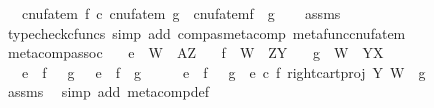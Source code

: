 \begin{isabellebody}
\ \ \ {\isachardoublequoteopen}cnufatem\ f\ {\isasymcirc}\isactrlsub c\ cnufatem\ g\ {\isacharequal}{\kern0pt}\ cnufatem{\isacharparenleft}{\kern0pt}f\ {\isasymbox}\ g{\isacharparenright}{\kern0pt}{\isachardoublequoteclose}\isanewline
%
\isadelimproof
\ \ %
\endisadelimproof
%
\isatagproof
{}\isamarkupfalse%
\ assms\ \isamarkupfalse%
\ {\isacharparenleft}{\kern0pt}typecheck{\isacharunderscore}{\kern0pt}cfuncs{\isacharcomma}{\kern0pt}\ simp\ add{\isacharcolon}{\kern0pt}\ comp{\isacharunderscore}{\kern0pt}as{\isacharunderscore}{\kern0pt}metacomp\ metafunc{\isacharunderscore}{\kern0pt}cnufatem{\isacharparenright}{\kern0pt}%
\endisatagproof
{\isafoldproof}%
%
\isadelimproof
\isanewline
%
\endisadelimproof
\isanewline
{}\isamarkupfalse%
\ meta{\isacharunderscore}{\kern0pt}comp{\isacharunderscore}{\kern0pt}assoc{\isacharcolon}{\kern0pt}\isanewline
\ \ \ {\isachardoublequoteopen}e\ {\isacharcolon}{\kern0pt}\ W\ {\isasymrightarrow}\ A\isactrlbsup Z\isactrlesup {\isachardoublequoteclose}\isanewline
\ \ \ {\isachardoublequoteopen}f\ {\isacharcolon}{\kern0pt}\ W\ {\isasymrightarrow}\ Z\isactrlbsup Y\isactrlesup {\isachardoublequoteclose}\isanewline
\ \ \ {\isachardoublequoteopen}g\ {\isacharcolon}{\kern0pt}\ W\ {\isasymrightarrow}\ Y\isactrlbsup X\isactrlesup {\isachardoublequoteclose}\isanewline
\ \ \ {\isachardoublequoteopen}{\isacharparenleft}{\kern0pt}e\ {\isasymbox}\ f{\isacharparenright}{\kern0pt}\ {\isasymbox}\ \ g\ \ {\isacharequal}{\kern0pt}\ e\ {\isasymbox}\ {\isacharparenleft}{\kern0pt}f\ {\isasymbox}\ g{\isacharparenright}{\kern0pt}{\isachardoublequoteclose}\isanewline
%
\isadelimproof
%
\endisadelimproof
%
\isatagproof
{}\isamarkupfalse%
\ {\isacharminus}{\kern0pt}\isanewline
\ \ \isamarkupfalse%
\ {\isachardoublequoteopen}{\isacharparenleft}{\kern0pt}e\ {\isasymbox}\ f{\isacharparenright}{\kern0pt}\ {\isasymbox}\ \ g\ {\isacharequal}{\kern0pt}\ {\isacharparenleft}{\kern0pt}e\isactrlsup {\isasymflat}\ {\isasymcirc}\isactrlsub c\ {\isasymlangle}f\isactrlsup {\isasymflat}{\isacharcomma}{\kern0pt}\ right{\isacharunderscore}{\kern0pt}cart{\isacharunderscore}{\kern0pt}proj\ Y\ W{\isasymrangle}{\isacharparenright}{\kern0pt}\isactrlsup {\isasymsharp}\ {\isasymbox}\ g{\isachardoublequoteclose}\isanewline
\ \ \ \ \isamarkupfalse%
\ assms\ \isamarkupfalse%
\ {\isacharparenleft}{\kern0pt}simp\ add{\isacharcolon}{\kern0pt}\ meta{\isacharunderscore}{\kern0pt}comp{}{\isacharunderscore}{\kern0pt}def{}{\isacharparenright}{\kern0pt}\isanewline

\end{isabellebody}
